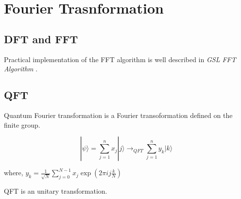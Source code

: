 \chapter{Fourier Trasnformation}

\section{DFT and FFT}

Practical implementation of the FFT algorithm is well described in 
\textit{GSL FFT Algorithm} \cite{brian_gough_2023_7898076}.

\section{QFT}

Quantum Fourier transformation is a Fourier transoformation 
defined on the finite group.

\begin{equation}
    \label{eq:qft_def}
    | \psi \rangle = \sum_{j=1}^n x_j | j \rangle \rightarrow_{QFT} \sum_{j=1}^n y_k | k \rangle
\end{equation}

where, $y_k = \frac{1}{\sqrt{N}} \sum_{j=0}^{N-1} x_j \exp\left( 2 \pi i j \frac{k}{N} \right)$

\begin{theorem}
    QFT is an unitary transformation.
\end{theorem}

